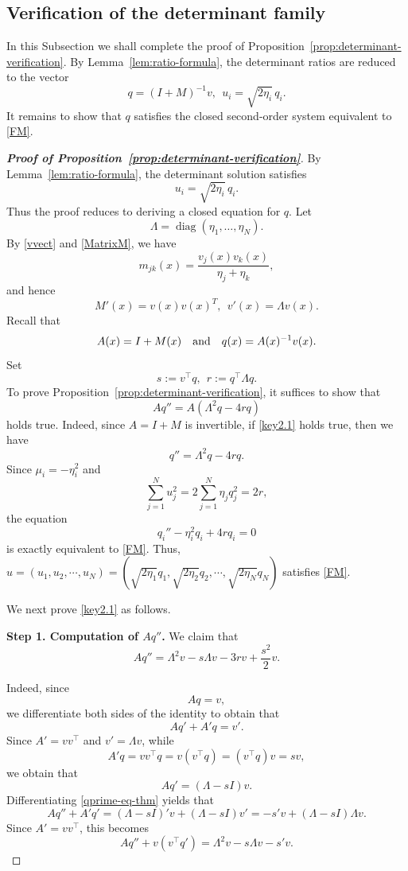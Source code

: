 \documentclass[11pt]{article}
\numberwithin{equation}{section}
\theoremstyle{definition}
\begin{document}
\subsection{Verification of the determinant family }
In this Subsection we shall complete the proof of Proposition~\ref{prop:determinant-verification}.
By Lemma~\ref{lem:ratio-formula}, the determinant ratios are reduced to
the vector
\[
q=(I+M)^{-1}v,
\ \
u_i=\sqrt{2\eta_i}\,q_i .
\]
It remains to show that \(q\) satisfies the closed second-order system
equivalent to \eqref{FM}.
\begin{proof}[\normalfont\bfseries Proof of Proposition~\ref{prop:determinant-verification}]
By Lemma~\ref{lem:ratio-formula}, the determinant solution satisfies
\[
u_i=\sqrt{2\eta_i}\,q_i.
\]
Thus the proof reduces to deriving a closed equation for \(q\).
Let
\[
\Lambda=\operatorname{diag}(\eta_1,\dots,\eta_N).
\]
By \eqref{vvect} and \eqref{MatrixM}, we have
\[
m_{jk}(x)=\frac{v_j(x)v_k(x)}{\eta_j+\eta_k},
\]
and hence
\[
M'(x)=v(x)v(x)^T,
\ \
v'(x)=\Lambda v(x).
\]
Recall that
\[
A(x)=I+M(x)\quad\hbox{and}\quad q(x)=A(x)^{-1}v(x).
\]
Set
\[
s:=v^\top q,\ \  r:=q^\top\Lambda q.
\]
To prove  Proposition~\ref{prop:determinant-verification}, it suffices to show that
\begin{equation}\label{key2.1}
Aq''=A(\Lambda^2q-4rq)
\end{equation}
holds true.
Indeed, since $A=I+M$ is invertible, if \eqref{key2.1} holds true, then we have
\begin{equation}\label{qsecond-final-thm}
q''=\Lambda^2q-4rq.
\end{equation}
Since \(\mu_i=-\eta_i^2\) and
\[
\sum_{j=1}^N u_j^2
=
2\sum_{j=1}^N\eta_jq_j^2=2r,
\]
the equation
\[
q_i''-\eta_i^2q_i+4rq_i=0
\]
is exactly equivalent to \eqref{FM}.
Thus, $u=(u_1,u_2,\cdots,u_N)=(\sqrt{2\eta_1}q_1,\sqrt{2\eta_2}q_2,\cdots,\sqrt{2\eta_N}q_N)$ satisfies \eqref{FM}.

We next prove \eqref{key2.1} as follows.

\medskip
\noindent
\textbf{Step 1. Computation of $Aq''$.}
We claim that
\begin{equation}\label{qsecond2-thm}
Aq''=\Lambda^2v-s\Lambda v-3rv+\frac{s^2}{2}v.
\end{equation}


Indeed, since
\[
Aq=v,
\]
we differentiate both sides of the identity   to obtain that
\[
Aq'+A'q=v'.
\]
Since $A'=vv^\top$ and $v'=\Lambda v$, while
\[
A'q=vv^\top q=v(v^\top q)=(v^\top q)v=sv,
\]
we obtain that
\begin{equation}\label{qprime-eq-thm}
Aq'=(\Lambda-sI)v.
\end{equation}
Differentiating \eqref{qprime-eq-thm} yields that
\[
Aq''+A'q'
=
(\Lambda-sI)'v+(\Lambda-sI)v'
=
-s'v+(\Lambda-sI)\Lambda v.
\]
Since $A'=vv^\top$, this becomes
\begin{equation}\label{qsecond1-thm}
Aq''+v(v^\top q')
=
\Lambda^2v-s\Lambda v-s'v.
\end{equation}



\end{proof}
\end{document}
